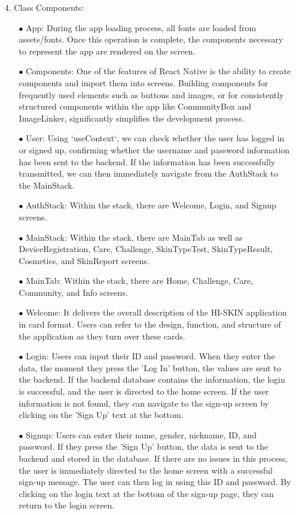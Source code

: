 \documentclass[conference]{IEEEtran}
\begin{document}
\begin{itemize}
\item[4.] Class Components:
\begin{itemize}
    \item[$\bullet$] App: During the app loading process, all fonts are loaded from assets/fonts. Once this operation is complete, the components necessary to represent the app are rendered on the screen.
    \item[$\bullet$] Components: One of the features of React Native is the ability to create components and import them into screens. Building components for frequently used elements such as buttons and images, or for consistently structured components within the app like CommunityBox and ImageLinker, significantly simplifies the development process.
    \item[$\bullet$] User:  Using `useContext`, we can check whether the user has logged in or signed up, confirming whether the username and password information has been sent to the backend. If the information has been successfully transmitted, we can then immediately navigate from the AuthStack to the MainStack.
    \item[$\bullet$] AuthStack: Within the stack, there are Welcome, Login, and Signup screens.
    \item[$\bullet$] MainStack: Within the stack, there are MainTab as well as DeviceRegistration, Care, Challenge, SkinTypeTest, SkinTypeResult, Cosmetics, and SkinReport screens.
    \item[$\bullet$] MainTab: Within the stack, there are Home, Challenge, Care, Community, and Info screens.
    \item[$\bullet$] Welcome: It delivers the overall description of the HI-SKIN application in card format. Users can refer to the design, function, and structure of the application as they turn over these cards.
    \item[$\bullet$] Login: Users can input their ID and password. When they enter the data, the moment they press the 'Log In' button, the values are sent to the backend. If the backend database contains the information, the login is successful, and the user is directed to the home screen. If the user information is not found, they can navigate to the sign-up screen by clicking on the 'Sign Up' text at the bottom.
    \item[$\bullet$] Signup: Users can enter their name, gender, nickname, ID, and password. If they press the 'Sign Up' button, the data is sent to the backend and stored in the database. If there are no issues in this process, the user is immediately directed to the home screen with a successful sign-up message. The user can then log in using this ID and password. By clicking on the login text at the bottom of the sign-up page, they can return to the login screen.

\end{itemize}
\end{itemize}
\end{document}
